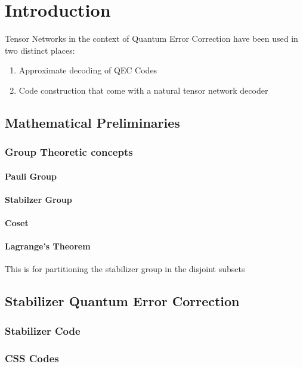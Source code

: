 \chapter{Introduction}

Tensor Networks in the context of Quantum Error Correction have been used in two distinct places:
\begin{enumerate}
    \item Approximate decoding of QEC Codes
    \item Code construction that come with a natural tensor network decoder
\end{enumerate}



\section{Mathematical Preliminaries}
\subsection{Group Theoretic concepts}

\subsubsection{Pauli Group}


\subsubsection{Stabilzer Group}


\subsubsection{Coset}

\subsubsection{Lagrange's Theorem}
This is for partitioning the stabilizer group in the disjoint subsets


\section{Stabilizer Quantum Error Correction}
\subsection{Stabilizer Code}


\subsection{CSS Codes}


